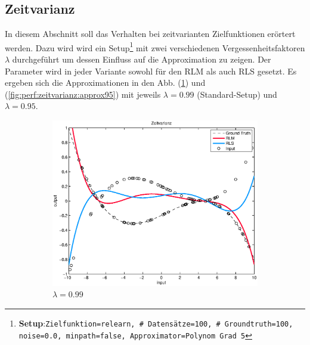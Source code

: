 \documentclass[a4paper, 12pt]{article}
\begin{document}
{\subsection{Zeitvarianz}
\label{sec:perf:zeitvarianz}
In diesem Abschnitt soll das Verhalten bei zeitvarianten Zielfunktionen erörtert werden.
Dazu wird wird ein Setup\footnote{\textbf{Setup}:\quad\texttt{Zielfunktion=relearn, \# Datensätze=100, \# Groundtruth=100, noise=0.0, minpath=false, Approximator=Polynom Grad 5}} mit zwei verschiedenen Vergessenheitsfaktoren $\lambda$ durchgeführt um dessen Einfluss auf die Approximation zu zeigen. Der Parameter wird in jeder Variante sowohl für den RLM als auch RLS gesetzt. Es ergeben sich die Approximationen in den Abb. (\ref{fig:perf:zeitvarianz:approx99}) und (\ref{fig:perf:zeitvarianz:approx95}) mit jeweils $\lambda=0.99$ (Standard-Setup) und $\lambda=0.95$.
\begin{figure}[H]
        \centering
        \begin{subfigure}[b]{0.4\textwidth}
                \centering
                \includegraphics[width=\textwidth]{./images/copyofstats/zeitvarianz(99)5_approx_100.eps}
                \caption{$\lambda=0.99$}
                \label{fig:perf:zeitvarianz:approx99}
        \end{subfigure}
        \begin{subfigure}[b]{0.4\textwidth}
                \centering

\end{subfigure}
\end{figure}}
\end{document}
